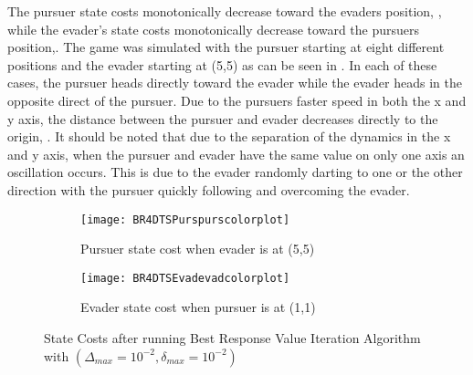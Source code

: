 The pursuer state costs monotonically decrease toward the evaders position, , while the evader's state costs monotonically decrease toward the pursuers position,. The game was simulated with the pursuer starting at eight different positions and the evader starting at (5,5) as can be seen in . In each of these cases, the pursuer heads directly toward the evader while the evader heads in the opposite direct of the pursuer. Due to the pursuers faster speed in both the x and y axis, the distance between the pursuer and evader decreases directly to the origin, . It should be noted that due to the separation of the dynamics in the x and y axis, when the pursuer and evader have the same value on only one axis an oscillation occurs. This is due to the evader randomly darting to one or the other direction with the pursuer quickly following and overcoming the evader.
\begin{figure}[h!]
\centering
\begin{subfigure}[t]{0.475\textwidth}
	\centering
	\texttt{[image: BR4DTSPurspurscolorplot]}
	\caption{Pursuer state cost when evader is at (5,5)}
	\label{BR4DTSPcp}
\end{subfigure}
\hfill
\begin{subfigure}[t]{0.475\textwidth}
	\centering
	\texttt{[image: BR4DTSEvadevadcolorplot]}
	\caption{Evader state cost when pursuer is at (1,1)}
	\label{BR4DTSEcp}
\end{subfigure}
\caption{State Costs after running Best Response Value Iteration Algorithm with $(\Delta_{max} = 10^{-2},\delta_{max} = 10^{-2})$}
\label{BR4DTScp}
\end{figure}
